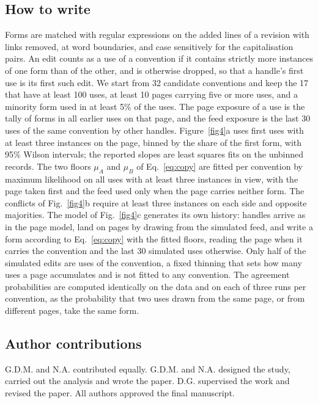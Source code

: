 \documentclass[twocolumn,10pt]{article}
\begin{document}
\subsection{How to write}
Forms are matched with regular expressions on the added lines of a revision with links removed, at word boundaries, and case sensitively for the capitalisation pairs. An edit counts as a use of a convention if it contains strictly more instances of one form than of the other, and is otherwise dropped, so that a handle's first use is its first such edit. We start from 32 candidate conventions and keep the 17 that have at least 100 uses, at least 10 pages carrying five or more uses, and a minority form used in at least 5\% of the uses. The page exposure of a use is the tally of forms in all earlier uses on that page, and the feed exposure is the last 30 uses of the same convention by other handles. Figure~\ref{fig4}a uses first uses with at least three instances on the page, binned by the share of the first form, with 95\% Wilson intervals; the reported slopes are least squares fits on the unbinned records. The two floors $\mu_A$ and $\mu_B$ of Eq.~\eqref{eq:copy} are fitted per convention by maximum likelihood on all uses with at least three instances in view, with the page taken first and the feed used only when the page carries neither form. The conflicts of Fig.~\ref{fig4}b require at least three instances on each side and opposite majorities. The model of Fig.~\ref{fig4}c generates its own history: handles arrive as in the page model, land on pages by drawing from the simulated feed, and write a form according to Eq.~\eqref{eq:copy} with the fitted floors, reading the page when it carries the convention and the last 30 simulated uses otherwise. Only half of the simulated edits are uses of the convention, a fixed thinning that sets how many uses a page accumulates and is not fitted to any convention. The agreement probabilities are computed identically on the data and on each of three runs per convention, as the probability that two uses drawn from the same page, or from different pages, take the same form.

\subsection{Author contributions}
G.D.M. and N.A. contributed equally. G.D.M. and N.A. designed the study, carried out the analysis and wrote the paper. D.G. supervised the work and revised the paper. All authors approved the final manuscript.
\end{document}
